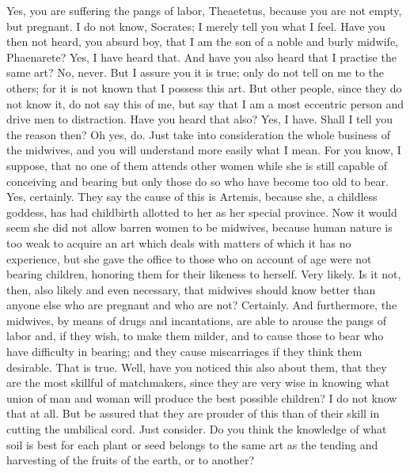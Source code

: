 \documentclass[letterpaper,12pt]{article}
\newcommand{\stephpag}[1]{\marginnote{\small\itshape\fontfamily{ppl}\selectfont #1}}
\begin{document}
\begin{drama}
\socratesspeaks
Yes, you are suffering the pangs of labor, Theaetetus, because you are not empty, but pregnant.
\theaetetusspeaks
I do not know, Socrates; I merely tell you what I feel. \stephpag{149 a}
\socratesspeaks
Have you then not heard, you absurd boy, that I am the son of a noble and burly midwife, Phaenarete?
\theaetetusspeaks
Yes, I have heard that.
\socratesspeaks
And have you also heard that I practise the same art?
\theaetetusspeaks
No, never.
\socratesspeaks
But I assure you it is true; only do not tell on me to the others; for it is not known that I possess this art. But other people, since they do not know it, do not say this of me, but say that I am a most eccentric person and drive men to distraction. Have you heard that also? \stephpag{b}
\theaetetusspeaks
Yes, I have.
\socratesspeaks
Shall I tell you the reason then?
\theaetetusspeaks
Oh yes, do.
\socratesspeaks
Just take into consideration the whole business of the midwives, and you will understand more easily what I mean. For you know, I suppose, that no one of them attends other women while she is still capable of conceiving and bearing but only those do so who have become too old to bear.
\theaetetusspeaks
Yes, certainly.
\socratesspeaks
They say the cause of this is Artemis, because she, a childless goddess, has had childbirth allotted to her as her special province. Now it would seem she did not allow \stephpag{c} barren women to be midwives, because human nature is too weak to acquire an art which deals with matters of which it has no experience, but she gave the office to those who on account of age were not bearing children, honoring them for their likeness to herself.
\theaetetusspeaks
Very likely.
\socratesspeaks
Is it not, then, also likely and even necessary, that midwives should know better than anyone else who are pregnant and who are not?
\theaetetusspeaks
Certainly.
\socratesspeaks
And furthermore, the midwives, by means of drugs \stephpag{d} and incantations, are able to arouse the pangs of labor and, if they wish, to make them milder, and to cause those to bear who have difficulty in bearing; and they cause miscarriages if they think them desirable.
\theaetetusspeaks
That is true.
\socratesspeaks
Well, have you noticed this also about them, that they are the most skillful of matchmakers, since they are very wise in knowing what union of man and woman will produce the best possible children?
\theaetetusspeaks
I do not know that at all.
\socratesspeaks
But be assured that they are prouder of this \stephpag{e} than of their skill in cutting the umbilical cord. Just consider. Do you think the knowledge of what soil is best for each plant or seed belongs to the same art as the tending and harvesting of the fruits of the earth, or to another?

\end{drama}
\end{document}
